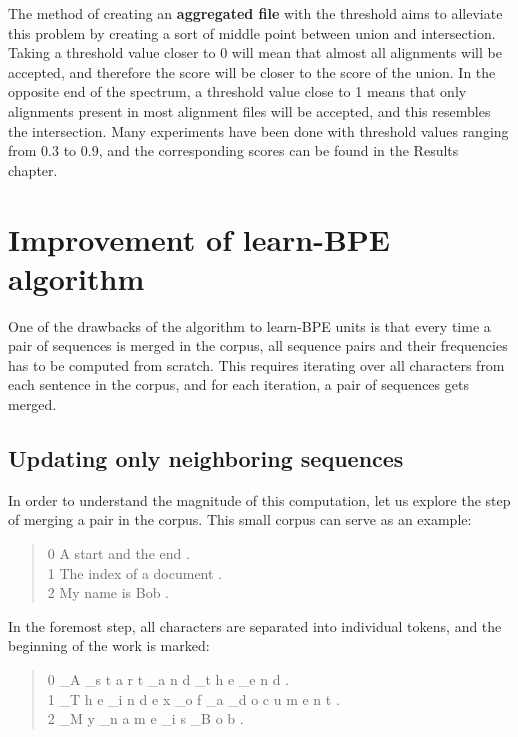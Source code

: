 The method of creating an \textbf{aggregated file} with the threshold aims to alleviate this problem by creating a sort of middle point between union and intersection. Taking a threshold value closer to 0 will mean that almost all alignments will be accepted, and therefore the score will be closer to the score of the union. In the opposite end of the spectrum, a threshold value close to 1 means that only alignments present in most alignment files will be accepted, and this resembles the intersection. Many experiments have been done with threshold values ranging from 0.3 to 0.9, and the corresponding scores can be found in the Results chapter.

\section{Improvement of learn-BPE algorithm}\label{sec:improvlearnbpe}

One of the drawbacks of the algorithm to learn-BPE units is that every time a pair of sequences is merged in the corpus, all sequence pairs and their frequencies has to be computed from scratch. This requires iterating over all characters from each sentence in the corpus, and for each iteration, a pair of sequences gets merged.

\subsection{Updating only neighboring sequences}

In order to understand the magnitude of this computation, let us explore the step of merging a pair in the corpus. This small corpus can serve as an example:

\begin{quote}
	0	A start and the end .\\
	1 	The index of a document .\\
	2 	My name is Bob .
\end{quote}

In the foremost step, all characters are separated into individual tokens, and the beginning of the work is marked:

\begin{quote}
	0	\_A \_s t a r t \_a n d \_t h e \_e n d .\\
	1 	\_T h e \_i n d e x \_o f \_a \_d o c u m e n t .\\
	2 	\_M y \_n a m e \_i s \_B o b .
\end{quote}

